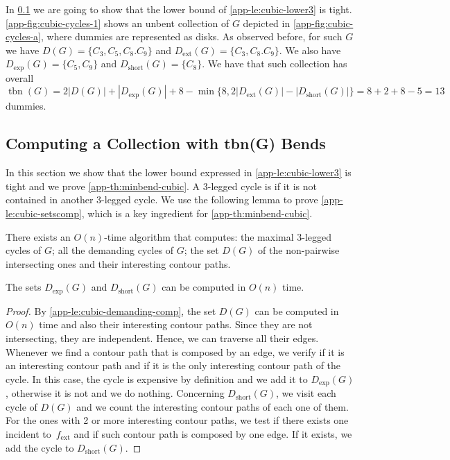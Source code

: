 \documentclass[runningheads]{llncs}
\newcommand{\tbn}{\operatorname{tbn}}
\newcommand{\ext}{\operatorname{ext}}
\newcommand{\short}{\operatorname{short}}
\let\emph\relax\DeclareTextFontCommand{\emph}{\color{dark blue}\em}
\begin{document}
 In \cref{app-subse:cubic-alg} we are going to show that the lower bound of \cref{app-le:cubic-lower3} is tight.  \cref{app-fig:cubic-cycles-1} shows an unbent collection of $G$ depicted in \cref{app-fig:cubic-cycles-a}, where dummies are represented as disks. As observed before, for such $G$ we have $D(G)=\{C_3,C_5,C_8.C_9\}$ and $D_{\ext}(G)=\{C_3,C_8.C_9\}$. We also have $D_{\exp}(G)=\{C_5,C_9\}$ and $D_{\short}(G)=\{C_8\}$. We have that such collection has overall $\tbn(G)= 2|D(G)|+|D_{\exp}(G)|+8-\min\{8, 2|D_{\ext}(G)|-|D_{\short}(G)|\}=8+2+8-5=13$ dummies.



\subsection{Computing a Collection with tbn(G) Bends}
\label{app-subse:cubic-alg}

In this section we show that the lower bound expressed in \cref{app-le:cubic-lower3} is tight and we prove \cref{app-th:minbend-cubic}. A 3-legged cycle is \emph{maximal} if it is not contained in another 3-legged cycle. We use the following lemma to prove \cref{app-le:cubic-setscomp}, which is a key ingredient for \cref{app-th:minbend-cubic}.

\begin{lemma}
\label{app-le:cubic-demanding-comp} 
There exists an $O(n)$-time algorithm that computes: the maximal 3-legged cycles of $G$; all the demanding cycles of $G$; the set $D(G)$ of the non-pairwise intersecting ones and their interesting contour paths.
\end{lemma}


\begin{lemma}
\label{app-le:cubic-setscomp}
The sets $D_{\exp}(G)$ and $D_{\short}(G)$ can be computed in $O(n)$ time.
\end{lemma}
\begin{proof}
  By \cref{app-le:cubic-demanding-comp}, the set $D(G)$ can be
  computed in $O(n)$ time and also their interesting contour
  paths. Since they are not intersecting, they are independent. Hence,
  we can traverse all their edges. Whenever we find a contour path
  that is composed by an edge, we verify if it is an interesting
  contour path and if it is the only interesting contour path of the
  cycle. In this case, the cycle is expensive by definition and we add it to $D_{\exp}(G)$, otherwise
  it is not and we do nothing. Concerning $D_{\short}(G)$, we visit each cycle of
  $D(G)$ and we count the interesting contour paths of each one of
  them. For the ones with 2 or more interesting contour paths, we test
  if there exists one incident to~$f_{\ext}$ and if such contour path is composed by one edge.  If it exists, we add
  the cycle to $D_{\short}(G)$.
\end{proof}
 
\end{document}
